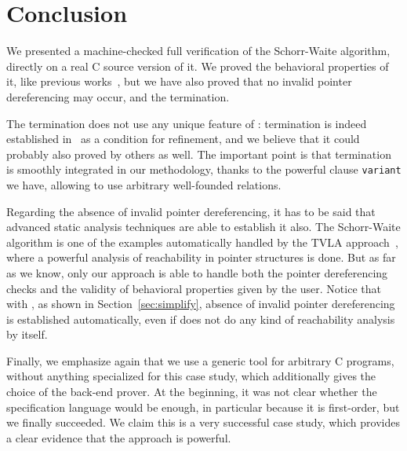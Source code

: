 \section{Conclusion}
\label{sec:conclusion}

We presented a machine-checked full verification of the Schorr-Waite
algorithm, directly on a real C source version of it. We 
proved the behavioral properties of it, like previous
works~\cite{bornat00mpc,mehta03cade,abrial03fme}, but we have also
proved that no invalid pointer dereferencing may occur, and the
termination.

The termination does not use any unique feature of \caduceus{}:
termination is indeed established in~\cite{abrial03fme} as a condition
for refinement, and we believe that it could probably also proved by
others as well. The important point is that termination is smoothly
integrated in our methodology, thanks to the powerful clause
\texttt{variant} we have, allowing to use arbitrary well-founded
relations.

Regarding the absence of invalid pointer dereferencing, it has to be
said that advanced static analysis techniques are able to establish it
also. The Schorr-Waite algorithm is one of the examples automatically
handled by the TVLA approach~\cite{sagiv02toplas,reps03esop}, where a powerful
analysis of reachability in pointer structures is done. But as far as
we know, only our approach is able to handle both the pointer
dereferencing checks and the validity of behavioral properties given
by the user. Notice that with \caduceus, as shown in
Section~\ref{sec:simplify}, absence of invalid pointer dereferencing
is established automatically, even if \caduceus{} does not do any kind of
reachability analysis by itself.

Finally, we emphasize again that we use a generic tool for arbitrary C
programs, without anything specialized for this case study, which
additionally gives the choice of the back-end prover. At the
beginning, it was not clear whether the \caduceus{} specification
language would be enough, in particular because it is first-order, but
we finally succeeded.  We claim this is a very successful case study,
which provides a clear evidence that the \caduceus{} approach is
powerful. 


